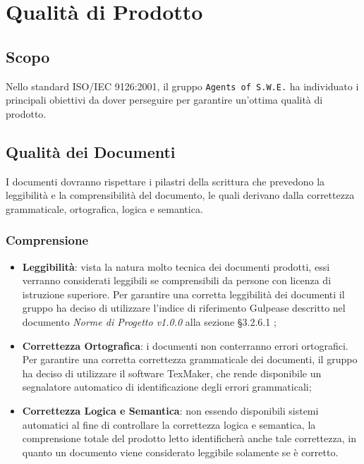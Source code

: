 \section{Qualità di Prodotto}
\label{qualitaProdotto}

\subsection{Scopo}

Nello standard ISO/IEC 9126:2001, il gruppo \texttt{Agents of S.W.E.} ha individuato i principali obiettivi da dover perseguire per garantire un'ottima qualità di prodotto.  

\subsection{Qualità dei Documenti}

I documenti dovranno rispettare i pilastri della scrittura che prevedono la leggibilità e la comprensibilità del documento, le quali derivano dalla correttezza grammaticale, ortografica, logica e semantica.

\subsubsection{Comprensione}

\begin{itemize}
	\item \textbf{Leggibilità}: vista la natura molto tecnica dei documenti prodotti, essi verranno considerati leggibili se comprensibili da persone con licenza di istruzione superiore. Per garantire una corretta leggibilità dei documenti il gruppo ha deciso di utilizzare l'indice di riferimento Gulpease descritto nel documento \textit{Norme di Progetto v1.0.0} alla sezione §3.2.6.1 ;
	\item \textbf{Correttezza Ortografica}: i documenti non conterranno errori ortografici. Per garantire una corretta correttezza grammaticale dei documenti, il gruppo ha deciso di utilizzare il software TexMaker, che rende disponibile un segnalatore automatico di identificazione degli errori grammaticali;
	\item \textbf{Correttezza Logica e Semantica}: non essendo disponibili sistemi automatici al fine di controllare 
la correttezza logica e semantica, la comprensione totale del prodotto letto identificherà anche tale correttezza, in quanto un documento viene considerato leggibile solamente se è corretto.
\end{itemize}

